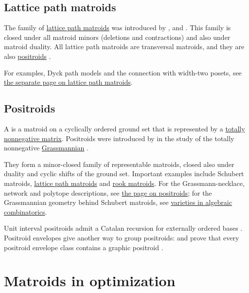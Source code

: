 \subsection[matroidLatticePathSummary]{Lattice path matroids}

The family of \hyperref[latticePathMatroids]{lattice path matroids} was
introduced by ,  and
 \cite{BoninMierNoy2003}. This family is closed under all
matroid minors (deletions and contractions) and also under matroid duality.
All lattice path matroids are transversal matroids, and they are also
\hyperref[positroid]{positroids} \cite{Oh2011}.

For examples, Dyck path models and the connection with width-two posets, see
\hyperref[latticePathMatroids]{the separate page on lattice path matroids}.


\subsection[matroidPositroidSummary]{Positroids}

A  is a matroid on a cyclically ordered ground set that is
represented by a \hyperref[totallyNonnegative]{totally nonnegative matrix}.
Positroids were introduced by
 in the study of the totally nonnegative
\hyperref[grassmannianVarieties]{Grassmannian} \cite{Postnikov2006x}.

They form a minor-closed family of representable matroids, closed also under
duality and cyclic shifts of the ground set.  Important examples include
Schubert matroids, \hyperref[latticePathMatroids]{lattice path matroids} and
\hyperref[rookMatroids]{rook matroids}. For the Grassmann-necklace,
network and polytope descriptions, see \hyperref[positroid]{the page on
positroids}; for the Grassmannian geometry behind Schubert matroids, see
\hyperref[schubertVarietiesAndMatroids]{varieties in algebraic
combinatorics}.

Unit interval positroids admit a Catalan recursion for externally ordered bases
\cite{CamachoChavez2021}.  Positroid envelopes give another way to group
positroids:  and  prove that every
positroid envelope class contains a graphic positroid \cite{QuailRombach2024x}.



\section[matroidOptimization]{Matroids in optimization}

